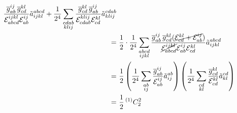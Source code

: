 \documentclass[11pt]{article}
\begin{document}
\begin{enumerate}
\begin{align*}
{  \ensuremath{\frac {\overline{g}_{ab}^{ij}\,\overline{g}_{cd}^{kl}}{\mathcal{E}_{abcd}^{ijkl}\mathcal{E}_{ab}^{ij}}}
  \ensuremath{\tilde}{a}^{abcd}_{ijkl}
+
  \ensuremath{\frac {1}{2^4}}
  \sum_{\substack{cdab\\klij}}
  \ensuremath{\frac {\overline{g}_{cd}^{kl}\,\overline{g}_{ab}^{ij}}{\mathcal{E}_{cdab}^{klij}\mathcal{E}_{cd}^{kl}}}
  \ensuremath{\tilde}{a}^{cdab}_{klij}
}
\\=&\
  \frac {1}{2}
  \cdot
  \frac {1}{2^4}
  \sum_{\substack{abcd\\ijkl}}
  \frac {
    \overline{g}_{ab}^{ij}\,
    \overline{g}_{cd}^{kl}
    (\cancel{
      \mathcal{E}_{cd}^{kl}
    +
      \mathcal{E}_{ab}^{ij}
    })
  }{
    \cancel{\mathcal{E}_{abcd}^{ijkl}}
    \mathcal{E}_{ab}^{ij}
    \mathcal{E}_{cd}^{kl}
  }
  \tilde{a}^{abcd}_{ijkl}
\\=&\
\frac {1}{2}
\left(
  \frac {1}{2^4}
  \sum_{\substack{ab\\ij}}
  \frac {
    \overline{g}_{ab}^{ij}
  }{
    \mathcal{E}_{ab}^{ij}
  }
  \tilde{a}^{ab}_{ij}
\right)
\left(
  \frac {1}{2^4}
  \sum_{\substack{cd\\kl}}
  \frac {
    \overline{g}_{cd}^{kl}
  }{
    \mathcal{E}_{cd}^{kl}
  }
  \tilde{a}^{cd}_{kl}
\right)\\=&\
  \frac {1}{2}
  \,{}^{(1)}C_2^2
\end{align*}

\end{enumerate}
\end{document}
